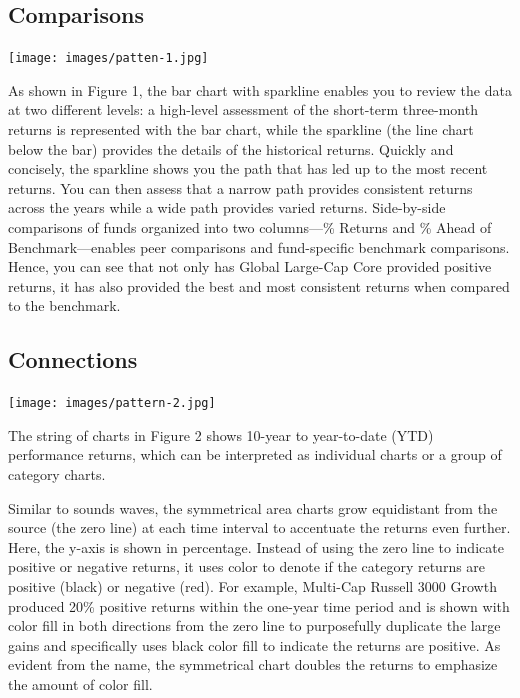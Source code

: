 \documentclass[]{book}
\begin{document}
\hypertarget{comparisons}{%
\subsection{Comparisons}\label{comparisons}}

\texttt{[image: images/patten-1.jpg]}

As shown in Figure 1, the bar chart with sparkline enables you to review the data at two different levels: a high-level assessment of the short-term three-month returns is represented with the bar chart, while the sparkline (the line chart below the bar) provides the details of the historical returns. Quickly and concisely, the sparkline shows you the path that has led up to the most recent returns. You can then assess that a narrow path provides consistent returns across the years while a wide path provides varied returns. Side-by-side comparisons of funds organized into two columns---\% Returns and \% Ahead of Benchmark---enables peer comparisons and fund-specific benchmark comparisons. Hence, you can see that not only has Global Large-Cap Core provided positive returns, it has also provided the best and most consistent returns when compared to the benchmark.

\hypertarget{connections}{%
\subsection{Connections}\label{connections}}

\texttt{[image: images/pattern-2.jpg]}

The string of charts in Figure 2 shows 10-year to year-to-date (YTD) performance returns, which can be interpreted as individual charts or a group of category charts.

Similar to sounds waves, the symmetrical area charts grow equidistant from the source (the zero line) at each time interval to accentuate the returns even further. Here, the y-axis is shown in percentage. Instead of using the zero line to indicate positive or negative returns, it uses color to denote if the category returns are positive (black) or negative (red). For example, Multi-Cap Russell 3000 Growth produced 20\% positive returns within the one-year time period and is shown with color fill in both directions from the zero line to purposefully duplicate the large gains and specifically uses black color fill to indicate the returns are positive. As evident from the name, the symmetrical chart doubles the returns to emphasize the amount of color fill.
\end{document}
